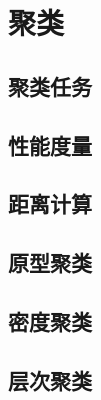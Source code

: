 \newpage
\section{聚类}
\subsection{聚类任务}
\subsection{性能度量}
\subsection{距离计算}
\subsection{原型聚类}
\subsection{密度聚类}
\subsection{层次聚类}
